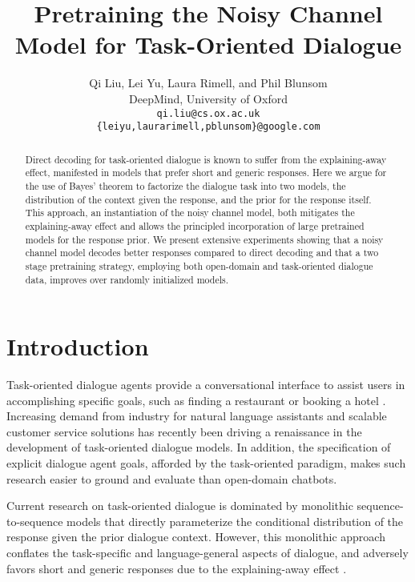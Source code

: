 \documentclass[11pt,a4paper]{article}
\title{Pretraining the Noisy Channel Model for Task-Oriented Dialogue}
\author{
Qi Liu\Thanks{Work completed during an internship at DeepMind.}, Lei Yu, Laura Rimell, and Phil Blunsom \\
 DeepMind, University of Oxford \\
  {\sf \texttt{qi.liu@cs.ox.ac.uk}} \\
  {\sf \texttt{\{leiyu,laurarimell,pblunsom\}@google.com}} \\
}
\date{}
\begin{document}
\maketitle

\begin{abstract}
Direct decoding for task-oriented dialogue is known to suffer from the explaining-away effect, manifested in models that prefer short and generic responses. Here we argue for the use of Bayes' theorem to factorize the dialogue task into two models, the distribution of the context given the response, and the prior for the response itself. This approach, an instantiation of the noisy channel model, both mitigates the explaining-away effect and allows the principled incorporation of large pretrained models for the response prior. We present extensive experiments showing that a noisy channel model decodes better responses compared to direct decoding and that a two stage pretraining strategy, employing both open-domain and task-oriented dialogue data, improves over randomly initialized models.

\end{abstract}

\section{Introduction}

Task-oriented dialogue agents provide a conversational interface to assist users in accomplishing specific goals, such as finding a restaurant or booking a hotel   \cite{seneff2000dialogue,raux2005let,budzianowski2018multiwoz,peng2020soloist}.
Increasing demand from industry for natural language assistants and scalable customer service solutions has recently been driving a renaissance in the development of task-oriented dialogue models.
In addition, the specification of explicit dialogue agent goals, afforded by the task-oriented paradigm, makes such research easier to ground and evaluate than open-domain chatbots.



Current research on task-oriented dialogue is dominated by monolithic sequence-to-sequence models that directly parameterize the conditional distribution of the response given the prior dialogue context. 
However, this monolithic approach conflates the task-specific and language-general aspects of dialogue, and adversely favors short and generic responses \cite{bao2020plato} due to the explaining-away effect \cite{klein2002conditional}. 
\end{document}
